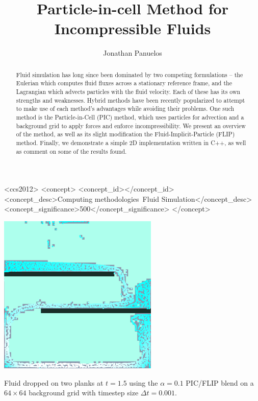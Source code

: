 \documentclass[sigconf]{acmart}
\begin{document}
\title{Particle-in-cell Method for Incompressible Fluids}

\author{Jonathan Panuelos}

\renewcommand{\shortauthors}{Panuelos}

\begin{abstract}
Fluid simulation has long since been dominated by two competing formulations -- the Eulerian which computes fluid fluxes across a stationary reference frame, and the Lagrangian which advects particles with the fluid velocity. Each of these has its own strengths and weaknesses. Hybrid methods have been recently popularized to attempt to make use of each method's advantages while avoiding their problems. One such method is the Particle-in-Cell (PIC) method, which uses particles for advection and a background grid to apply forces and enforce incompressibility. We present an overview of the method, as well as its slight modification the Fluid-Implicit-Particle (FLIP) method. Finally, we demonstrate a simple 2D implementation written in C++, as well as comment on some of the results found.
\end{abstract}

\begin{CCSXML}
<ccs2012>
<concept>
<concept_id></concept_id>
<concept_desc>Computing methodologies~Fluid Simulation</concept_desc>
<concept_significance>500</concept_significance>
</concept>
\end{CCSXML}



\begin{teaserfigure}
  \centering
  \includegraphics[width=3.0in]{img/Maze64.png}
  \caption{Fluid dropped on two planks at $t=1.5$ using the $\alpha{}=0.1$ PIC/FLIP blend on a $64\times{}64$ background grid with timestep size $\Delta{}t=0.001$.} \label{fig:teaser}
\end{teaserfigure}
\end{document}
